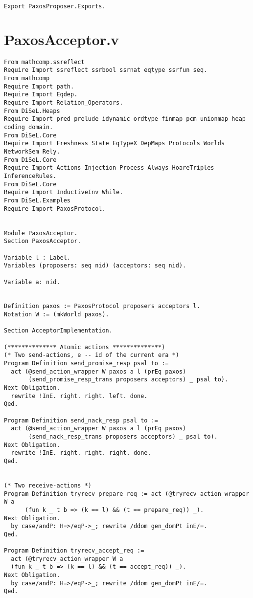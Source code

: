 \begin{landscape}
\begin{multicols*}{2}
\begin{lstlisting}[style=SourceCodeListing]
Export PaxosProposer.Exports.
\end{lstlisting}
\end{multicols*}

\newpage

\section{PaxosAcceptor.v}
\begin{multicols*}{2}
\begin{lstlisting}[style=SourceCodeListing]
From mathcomp.ssreflect
Require Import ssreflect ssrbool ssrnat eqtype ssrfun seq.
From mathcomp
Require Import path.
Require Import Eqdep.
Require Import Relation_Operators.
From DiSeL.Heaps
Require Import pred prelude idynamic ordtype finmap pcm unionmap heap coding domain.
From DiSeL.Core
Require Import Freshness State EqTypeX DepMaps Protocols Worlds NetworkSem Rely.
From DiSeL.Core
Require Import Actions Injection Process Always HoareTriples InferenceRules.
From DiSeL.Core
Require Import InductiveInv While.
From DiSeL.Examples
Require Import PaxosProtocol.


Module PaxosAcceptor.
Section PaxosAcceptor.

Variable l : Label.
Variables (proposers: seq nid) (acceptors: seq nid).

Variable a: nid.


Definition paxos := PaxosProtocol proposers acceptors l.
Notation W := (mkWorld paxos).

Section AcceptorImplementation.

(************** Atomic actions **************)
(* Two send-actions, e -- id of the current era *)
Program Definition send_promise_resp psal to :=
  act (@send_action_wrapper W paxos a l (prEq paxos)
       (send_promise_resp_trans proposers acceptors) _ psal to).
Next Obligation.
  rewrite !InE. right. right. left. done.
Qed.

Program Definition send_nack_resp psal to :=
  act (@send_action_wrapper W paxos a l (prEq paxos)
       (send_nack_resp_trans proposers acceptors) _ psal to).
Next Obligation.
  rewrite !InE. right. right. right. done.
Qed.


(* Two receive-actions *)
Program Definition tryrecv_prepare_req := act (@tryrecv_action_wrapper W a
      (fun k _ t b => (k == l) && (t == prepare_req)) _).
Next Obligation.
  by case/andP: H=>/eqP->_; rewrite /ddom gen_domPt inE/=.
Qed.

Program Definition tryrecv_accept_req :=
  act (@tryrecv_action_wrapper W a
  (fun k _ t b => (k == l) && (t == accept_req)) _).
Next Obligation.
  by case/andP: H=>/eqP->_; rewrite /ddom gen_domPt inE/=.
Qed.



\end{lstlisting}
\end{multicols*}
\end{landscape}
